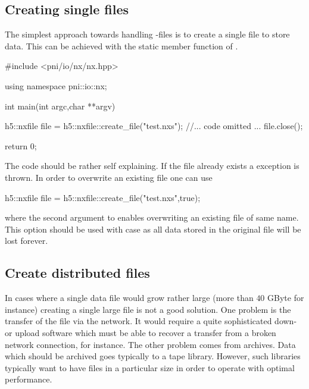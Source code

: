 
\subsection{Creating single files}
The simplest approach towards handling \nexus-files is to create a single file 
to store data. This can be achieved with the  static member 
function of .
\begin{cppcode}
#include <pni/io/nx/nx.hpp>

using namespace pni::io::nx;

int main(int argc,char **argv)
{
    h5::nxfile file = h5::nxfile::create_file("test.nxs");
    //... code omitted ...
    file.close();

    return 0;
}
\end{cppcode}
The code should be rather self explaining.  If the file already exists a
 exception is thrown. 
In order to overwrite an existing file one can use
\begin{cppcode}
h5::nxfile file = h5::nxfile::create_file("test.nxs",true);
\end{cppcode}
where the second argument to  enables overwriting an existing
file of same name. This option should be used with case as all data stored in 
the original file will be lost forever. 

\subsection{Create distributed files}
In cases where a single data file would grow rather large (more than $40$ GByte
for instance) creating a single large file is not a good solution. One problem
is the transfer of the file via the network. It would require a quite
sophisticated down- or upload software which must be able to recover a transfer
from a broken network connection, for instance. 
The other problem comes from archives. Data which should be archived goes
typically to a tape library. However, such libraries typically want to have
files in a particular size in order to operate with optimal performance. 

